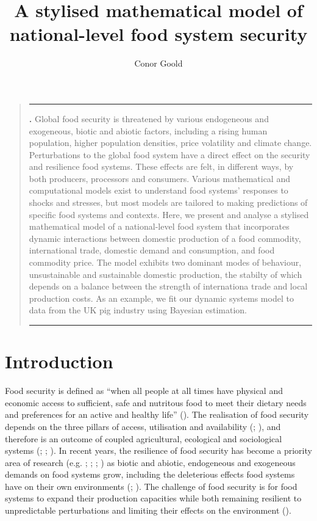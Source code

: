 \documentclass[12pt]{article}
\title{A stylised mathematical model of national-level food system security}
\author[1]{Conor Goold}
\affil[1]{Faculty of Biological Sciences, University of Leeds, LS2 9JT, UK}
\date{}
\renewenvironment{abstract}
{\begin{quote}
\small
\noindent \rule{\linewidth}{.5pt}\par{\bfseries \abstractname.}}
{\medskip\noindent \rule{\linewidth}{.5pt}
\end{quote}
}
\begin{document}
\linenumbers
\modulolinenumbers[5]

\maketitle
\begin{abstract}
  Global food security is threatened by various endogeneous and exogeneous, biotic and abiotic factors, including a rising human population, higher population densities, price volatility and climate change. Perturbations to the global food system have a direct effect on the security and resilience food systems. These effects are felt, in different ways, by both producers, processors and consumers. Various mathematical and computational models exist to understand food systems' responses to shocks and stresses, but most models are tailored to making predictions of specific food systems and contexts. Here, we present and analyse a stylised mathematical model of a national-level food system that incorporates dynamic interactions between domestic production of a food commodity, international trade, domestic demand and consumption, and food commodity price. The model exhibits two dominant modes of behaviour, unsustainable and sustainable domestic production, the stabilty of which depends on a balance between the strength of internationa trade and local production costs. As an example, we fit our dynamic systems model to data from the UK pig industry using Bayesian estimation.\\
\end{abstract}

\newpage
\tableofcontents

\section{Introduction}
Food security is defined as ``when all people at all times have physical and economic access to sufficient, safe and nutritous food to meet their dietary needs and preferences for an active and healthy life'' (\cite{FAO1996}). The realisation of food security depends on the three pillars of access, utilisation and availability (\cite{maxwell1996}; \cite{barrett2010}), and therefore is an outcome of coupled agricultural, ecological and sociological systems (\cite{hammond2012}; \cite{ericksen2008}; \cite{ingram2011}). In recent years, the resilience of food security has become a priority area of research (e.g. \cite{nystrom2019}; \cite{tendall2015}; \cite{bene2016}; \cite{seekell2017}) as biotic and abiotic, endogeneous and exogeneous demands on food systems grow, including the deleterious effects food systems have on their own environments (\cite{springmann2018}; \cite{strzepek2010}). The challenge of food security is for food systems to expand their production capacities while both remaining resilient to unpredictable perturbations and limiting their effects on the environment (\cite{ericksen2010}).
\end{document}
